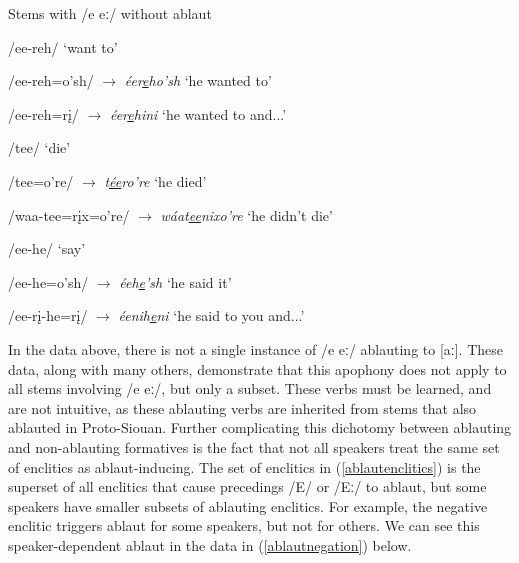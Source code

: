 \begin{exe}
\item\label{noablautstems} Stems with /e eː/ without ablaut

	\begin{xlist}

	\item\label{noablautstems1} /ee-reh/ `want to'

		\begin{xlist}

		\item /ee-reh=o'sh/ $\to$ \textit{éer\uline{e}ho'sh} `he wanted to'

		\item /ee-reh=rį/ $\to$ \textit{éer\uline{e}hini} `he wanted to and...'

		\end{xlist}

	\item\label{noablautstems2} /tee/ `die'

		\begin{xlist}

		\item /tee=o're/ $\to$ \textit{t\uline{ée}ro're} `he died'

		\item /waa-tee=rįx=o're/ $\to$ \textit{wáat\uline{ee}nixo're} `he didn't die'

		\end{xlist}

	\end{xlist}



	\item\label{noablautstems3} /ee-he/ `say'

		\begin{xlist}

		\item /ee-he=o'sh/ $\to$ \textit{éeh\uline{e}'sh} `he said it'

		\item /ee-rį-he=rį/ $\to$ \textit{éenih\uline{e}ni} `he said to you and...'

		\end{xlist}

\end{exe}

In the data above, there is not a single instance of /e eː/ ablauting to [aː]. These data, along with many others, demonstrate that this apophony does not apply to all stems involving /e eː/, but only a subset. These verbs must be learned, and are not intuitive, as these ablauting verbs are inherited from stems that also ablauted in Proto-Siouan. Further complicating this dichotomy between ablauting and non-ablauting formatives is the fact that not all speakers treat the same set of  enclitics as ablaut-inducing. The set of enclitics in (\ref{ablautenclitics}) is the superset of all enclitics that cause precedings /E/ or /Eː/ to ablaut, but some speakers have smaller subsets of ablauting enclitics. For example, the negative enclitic triggers ablaut for some speakers, but not for others. We can see this speaker-dependent ablaut in the data in (\ref{ablautnegation}) below.


